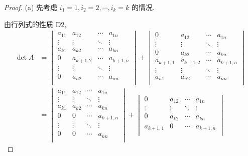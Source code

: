 \documentclass{ctexart}
\begin{document}
\begin{proof}
    (a) 先考虑 $i_1=1,i_2=2,\cdots,i_k=k$ 的情况.

    由行列式的性质 D2,
    \begin{align*}
        \det A & =\begin{vmatrix}
            a_{11} & a_{12} & \cdots & a_{1n} \\
            \vdots & \vdots & \ddots & \vdots \\
            a_{k1} & a_{k2} & \cdots & a_{kn} \\
            0 & a_{k+1,2} & \cdots & a_{k+1,n} \\
            \vdots & \vdots & \ddots & \vdots \\
            0 & a_{n2} & \cdots & a_{nn} \\
        \end{vmatrix}+\begin{vmatrix}
            0 & a_{12} & \cdots & a_{1n} \\
            \vdots & \vdots & \ddots & \vdots \\
            0 & a_{k2} & \cdots & a_{kn} \\
            a_{k+1,1} & a_{k+1,2} & \cdots & a_{k+1,n} \\
            \vdots & \vdots & \ddots & \vdots \\
            a_{n1} & a_{n2} & \cdots & a_{nn} \\
        \end{vmatrix} \\
        & =\begin{vmatrix}
            a_{11} & a_{12} & \cdots & a_{1n} \\
            \vdots & \vdots & \ddots & \vdots \\
            a_{k1} & a_{k2} & \cdots & a_{kn} \\
            0 & 0 & \cdots & a_{k+1,n} \\
            \vdots & \vdots & \ddots & \vdots \\
            0 & 0 & \cdots & a_{nn} \\
        \end{vmatrix}+\begin{vmatrix}
            0 & a_{12} & \cdots & a_{1n} \\
            \vdots & \vdots & \ddots & \vdots \\
            0 & a_{k2} & \cdots & a_{kn} \\
            a_{k+1,1} & 0 & \cdots & a_{k+1,n} \\

\end{vmatrix}
\end{align*}
\end{proof}
\end{document}
